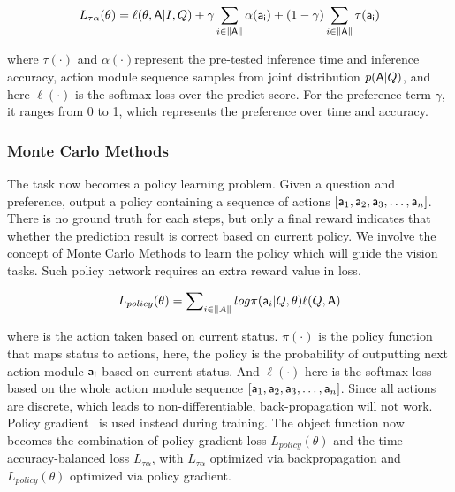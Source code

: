 \begin{small}
\begin{equation} 
    L_{\tau\alpha}(\theta) = \ell(\theta,{\mathsf{A}}|I, Q) + \gamma\sum_{i\in\|{\mathsf{A}}\|}\alpha({\mathsf{a_i}}) + (1-\gamma)\sum_{i\in\|{\mathsf{A}}\|}\tau({\mathsf{a_i}})
\end{equation}
\end{small}

\noindent where $\tau(\cdot)$ and $\alpha(\cdot)$represent the pre-tested inference time and inference accuracy, action module sequence  samples from joint distribution $p({\mathsf{A}}|Q)$, and here $\ell(\cdot)$ is the softmax loss over the predict score. For the preference term $\gamma$, it ranges from 0 to 1, which represents the preference over time and accuracy.

\subsubsection{Monte Carlo Methods}
\label{sec-MC}
\hspace{\parindent} The task now becomes a policy learning problem. Given a question and preference, output a policy containing a sequence of actions $[{\mathsf{a}}_1,{\mathsf{a}}_2,{\mathsf{a}}_3,\dots,{\mathsf{a}}_n]$. There is no ground truth for each steps, but only a final reward indicates that whether the prediction result is correct based on current policy. We involve the concept of Monte Carlo Methods to learn the policy which will guide the vision tasks. Such policy network requires an extra reward value in loss.

\begin{small}
\begin{equation} 
    L_{policy}(\theta) = \sum\nolimits_{i\in\|A\|} log\pi({\mathsf{a}}_{i}|Q,\theta)\ell(Q,{\mathsf{A}})
\end{equation}
\end{small}

\noindent where  is the action taken based on current status. $\pi(\cdot)$ is the policy function that maps status to actions, here, the policy is the probability of outputting next action module ${\mathsf{a_{i}}}$ based on current status. And $\ell(\cdot)$ here is the softmax loss based on the whole action module sequence $[{\mathsf{a}}_1,{\mathsf{a}}_2,{\mathsf{a}}_3,\dots,{\mathsf{a}}_n]$. Since all actions are discrete, which leads to non-differentiable, back-propagation will not work. Policy gradient~\cite{Liu_2017_ICCV} is used instead during training. The object function now becomes the combination of policy gradient loss $L_{policy}(\theta)$ and the time-accuracy-balanced loss $L_{\tau\alpha}$, with $L_{\tau\alpha}$ optimized via backpropagation and $L_{policy}(\theta)$ optimized via policy gradient. 



